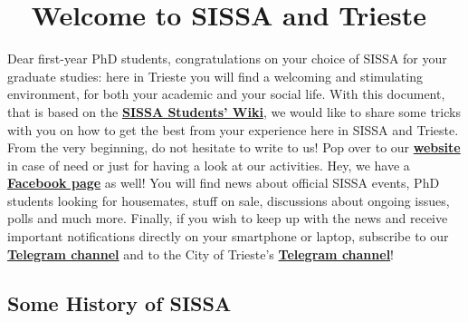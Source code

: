 \documentclass{sissavademecum}
\begin{document}
\maketitle
\tableofcontents
\newpage

\setlength{\parskip}{1em}


\chapter{\texorpdfstring{\faGlassCheers\ }{} Welcome to SISSA and Trieste}

Dear first-year PhD students, congratulations on your choice of SISSA for your graduate studies: here in Trieste you will find a welcoming and stimulating environment, for both your academic and your social life. With this document, that is based on the \href{https://wiki.sissa.it/students/index.php/Main_Page}{\textbf{SISSA Students' Wiki}}, we would like to share some tricks with you on how to get the best from your experience here in SISSA and Trieste. \\
From the very beginning, do not hesitate to write to us! Pop over to our \href{http://students.sissa.it/studentscouncil/index.html}{\textbf{website}} in case of need or just for having a look at our activities. Hey, we have a \href{https://www.facebook.com/groups/sissastudents/}{\textbf{Facebook page}} as well! You will find news about official SISSA events, PhD students looking for housemates, stuff on sale, discussions about ongoing issues, polls and much more. Finally, if you wish to keep up with the news and receive important notifications directly on your smartphone or laptop, subscribe to our \href{https://t.me/joinchat/FVSmmUDh3_QyYzU0}{\textbf{Telegram channel}} and to the City of Trieste's \href{https://telegram.me/comunetrieste}{\textbf{Telegram channel}}!

\vspace{-0.4cm}


\section{Some History of SISSA}
\end{document}
